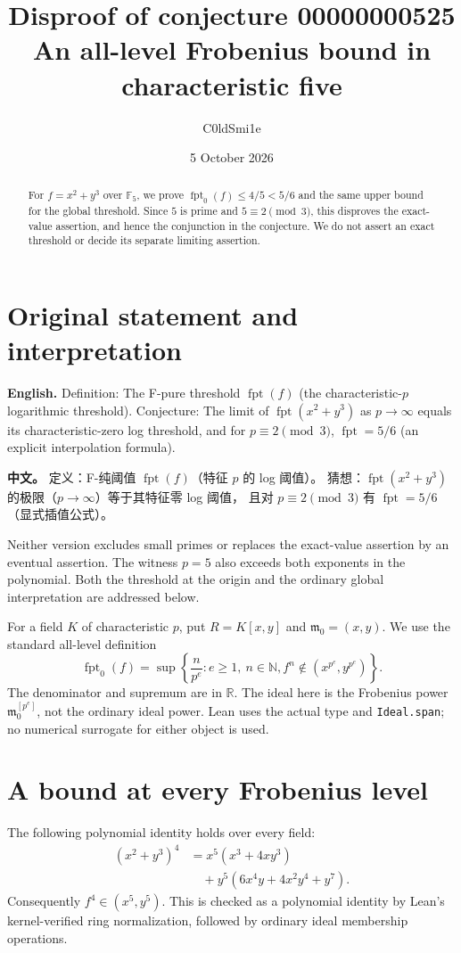\documentclass[11pt,a4paper]{article}
\title{Disproof of conjecture 00000000525\\[5pt]
\large An all-level Frobenius bound in characteristic five}
\author{C0ldSmi1e}
\date{5 October 2026}
\newcommand{\lean}[1]{\nolinkurl{#1}}
\newcommand{\code}[1]{\texttt{\detokenize{#1}}}
\newcommand{\F}{\mathbb F}
\newcommand{\fpt}{\operatorname{fpt}}
\newcommand{\origin}{\mathfrak m_0}
\begin{document}
\maketitle
\begin{abstract}
For $f=x^2+y^3$ over $\F_5$, we prove
$\fpt_0(f)\le 4/5<5/6$ and the same upper bound for the global threshold.
Since $5$ is prime and $5\equiv2\pmod3$, this disproves the exact-value
assertion, and hence the conjunction in the conjecture. We do not assert
an exact threshold or decide its separate limiting assertion.
\end{abstract}

\section{Original statement and interpretation}
\textbf{English.} Definition: The F-pure threshold $\fpt(f)$ (the
characteristic-$p$ logarithmic threshold). Conjecture: The limit of
$\fpt(x^2+y^3)$ as $p\to\infty$ equals its characteristic-zero log
threshold, and for $p\equiv2\pmod3$, $\fpt=5/6$ (an explicit interpolation
formula).

\textbf{中文。} 定义：F-纯阈值 $\fpt(f)$（特征 $p$ 的 log 阈值）。
猜想：$\fpt(x^2+y^3)$ 的极限（$p\to\infty$）等于其特征零 log 阈值，
且对 $p\equiv2\pmod3$ 有 $\fpt=5/6$（显式插值公式）。

Neither version excludes small primes or replaces the exact-value assertion
by an eventual assertion. The witness $p=5$ also exceeds both exponents
in the polynomial. Both the threshold at the origin and the ordinary
global interpretation are addressed below.

For a field $K$ of characteristic $p$, put $R=K[x,y]$ and
$\origin=(x,y)$. We use the standard all-level definition\,\cite{sv}
\[
 \fpt_0(f)=\sup\left\{\frac{n}{p^e}: e\ge1,\ n\in\mathbb N,
 f^n\notin(x^{p^e},y^{p^e})\right\}.
\]
The denominator and supremum are in $\mathbb R$. The ideal here is the
Frobenius power $\origin^{[p^e]}$, not the ordinary ideal power.
Lean uses the actual type \code{MvPolynomial (Fin 2) K} and
\lean{Ideal.span}; no numerical surrogate for either object is used.

\newpage
\section{A bound at every Frobenius level}
The following polynomial identity holds over every field:
\begin{align*}
 (x^2+y^3)^4
 &=x^5(x^3+4xy^3)\\
 &\quad+y^5(6x^4y+4x^2y^4+y^7).
\end{align*}
Consequently $f^4\in(x^5,y^5)$. This is checked as a polynomial identity
by Lean's kernel-verified ring normalization, followed by ordinary ideal
membership operations.
\end{document}
